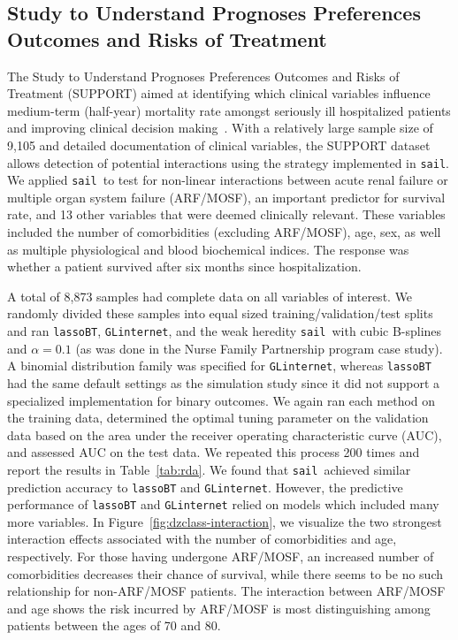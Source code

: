\documentclass[a4paper,fleqn]{cas-sc}
\newcommand{\sail}{\texttt{sail}}
\begin{document}
\subsection{Study to Understand Prognoses Preferences Outcomes and Risks of Treatment}

The Study to Understand Prognoses Preferences Outcomes and Risks of Treatment (SUPPORT) aimed at identifying which clinical variables influence medium-term (half-year) mortality rate amongst seriously ill hospitalized patients and improving clinical decision making~\citep{connors1995controlled}. 
With a relatively large sample size of 9,105 and detailed documentation of clinical variables, the SUPPORT dataset allows detection of potential interactions using the strategy implemented in \sail. 
We applied \sail ~to test for non-linear interactions between acute renal failure or multiple organ system failure (ARF/MOSF), an important predictor for survival rate, and 13 other variables that were deemed clinically relevant. 
These variables included the number of comorbidities (excluding ARF/MOSF), age, sex, as well as multiple physiological and blood biochemical indices. 
The response was whether a patient survived after six months since hospitalization.

A total of 8,873 samples had complete data on all variables of interest. 
We randomly divided these samples into equal sized training/validation/test splits and ran \texttt{lassoBT}, \texttt{GLinternet}, and the weak heredity \sail ~with cubic B-splines and $\alpha=0.1$ (as was done in the Nurse Family Partnership program case study). 
A binomial distribution family was specified for \texttt{GLinternet}, whereas \texttt{lassoBT} had the same default settings as the simulation study since it did not support a specialized implementation for binary outcomes. 
We again ran each method on the training data, determined the optimal tuning parameter on the validation data based on the area under the receiver operating characteristic curve (AUC), and assessed AUC on the test data. 
We repeated this process 200 times and report the results in Table~\ref{tab:rda}.
We found that \sail ~achieved similar prediction accuracy to \texttt{lassoBT} and \texttt{GLinternet}. 
However, the predictive performance of \texttt{lassoBT} and \texttt{GLinternet} relied on models which included many more variables. 
In Figure~\ref{fig:dzclass-interaction}, we visualize the two strongest interaction effects associated with the number of comorbidities and age, respectively. 
For those having undergone ARF/MOSF, an increased number of comorbidities decreases their chance of survival, while there seems to be no such relationship for non-ARF/MOSF patients. 
The interaction between ARF/MOSF and age shows the risk incurred by ARF/MOSF is most distinguishing among patients between the ages of 70 and 80.
\end{document}
